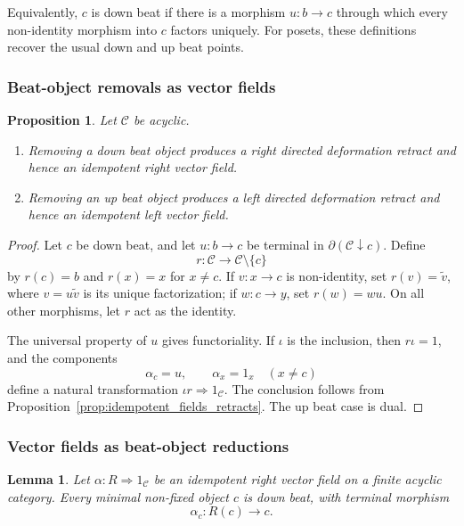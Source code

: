 \documentclass[12pt]{amsart}
\newtheorem{lemma}[teo]{Lemma}
\newtheorem{proposition}[teo]{Proposition}
\theoremstyle{definition}
\theoremstyle{remark}
\numberwithin{figure}{section}%
\newcommand{\CC}{\mathcal{C}}
\begin{document}
Equivalently, \(c\) is down beat if there is a morphism
\(u\colon b\to c\) through which every non-identity morphism into \(c\)
factors uniquely. For posets, these definitions recover the usual down
and up beat points.

\subsubsection{Beat-object removals as vector fields}

\begin{proposition}\label{prop:beat_object_vector_field}
Let \(\CC\) be acyclic.

\begin{enumerate}
    \item Removing a down beat object produces a right directed deformation
    retract and hence an idempotent right vector field.
    \item Removing an up beat object produces a left directed
    deformation retract and hence an idempotent left vector field.
\end{enumerate}
\end{proposition}

\begin{proof}
Let \(c\) be down beat, and let \(u\colon b\to c\) be terminal in
\(\partial(\CC\downarrow c)\). Define
\[
r\colon\CC\longrightarrow\CC\setminus\{c\}
\]
by \(r(c)=b\) and \(r(x)=x\) for \(x\neq c\). If \(v\colon x\to c\) is
non-identity, set \(r(v)=\widetilde v\), where
\(v=u\widetilde v\) is its unique factorization; if \(w\colon c\to y\),
set \(r(w)=wu\). On all other morphisms, let \(r\) act as the identity.

The universal property of \(u\) gives functoriality. If \(\iota\) is the
inclusion, then \(r\iota=1\), and the components
\[
\alpha_c=u,
\qquad
\alpha_x=1_x\quad(x\neq c)
\]
define a natural transformation
\(\iota r\Rightarrow1_\CC\). The conclusion follows from
Proposition~\ref{prop:idempotent_fields_retracts}. The up beat case is
dual.
\end{proof}

\subsubsection{Vector fields as beat-object reductions}

\begin{lemma}\label{lem:minimal_nonfixed_down_beat}
Let \(\alpha\colon R\Rightarrow1_\CC\) be an idempotent right vector field
on a finite acyclic category. Every minimal non-fixed object \(c\) is down
beat, with terminal morphism
\[
\alpha_c\colon R(c)\longrightarrow c.
\]
\end{lemma}
\end{document}

